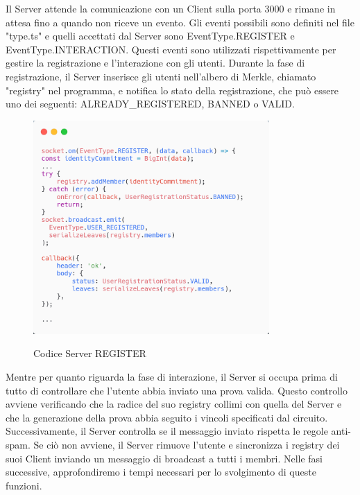 Il Server attende la comunicazione con un Client sulla porta 3000 e rimane in attesa fino a quando non riceve un evento.
Gli eventi possibili sono definiti nel file "type.ts" e quelli accettati dal Server sono EventType.REGISTER e
EventType.INTERACTION. Questi eventi sono utilizzati rispettivamente per gestire la registrazione e l'interazione con
gli utenti. Durante la fase di registrazione, il Server inserisce gli utenti nell'albero di Merkle, chiamato "registry"
nel programma, e notifica lo stato della registrazione, che può essere uno dei seguenti: ALREADY\_REGISTERED, BANNED o
VALID. 
\begin{figure}[H]
    \centering
    \includegraphics[width=9cm]{./chapters/3.poc/images/3.1.Server.png}
    \label{fig:1.Server}
    \captionsetup{justification=centering}
    \caption{Codice Server REGISTER}
\end{figure}
Mentre per quanto riguarda la fase di interazione, il Server si occupa prima di tutto di controllare che l'utente abbia
inviato una prova valida. Questo controllo avviene verificando che la radice del suo registry collimi con quella del
Server e che la generazione della prova abbia seguito i vincoli specificati dal circuito. Successivamente, il Server
controlla se il messaggio inviato rispetta le regole anti-spam. Se ciò non avviene, il Server rimuove l'utente e
sincronizza i registry dei suoi Client inviando un messaggio di broadcast a tutti i membri. Nelle fasi successive,
approfondiremo i tempi necessari per lo svolgimento di queste funzioni.
